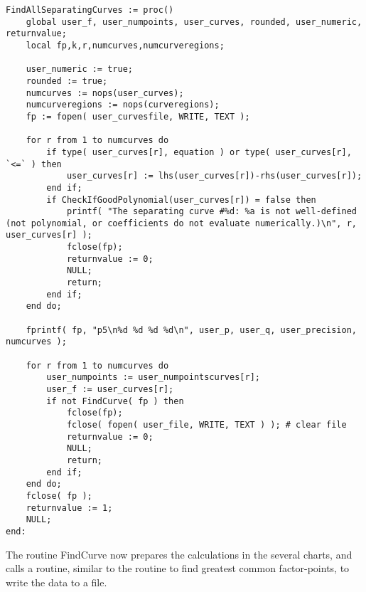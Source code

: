 \documentclass[a4paper,10pt]{article}
\begin{document}
\begin{lstlisting}[name=separatingcurves]
FindAllSeparatingCurves := proc()
    global user_f, user_numpoints, user_curves, rounded, user_numeric, returnvalue;
    local fp,k,r,numcurves,numcurveregions;

    user_numeric := true;
    rounded := true;
    numcurves := nops(user_curves);
    numcurveregions := nops(curveregions);
    fp := fopen( user_curvesfile, WRITE, TEXT );

    for r from 1 to numcurves do
        if type( user_curves[r], equation ) or type( user_curves[r], `<=` ) then
            user_curves[r] := lhs(user_curves[r])-rhs(user_curves[r]);
        end if;
        if CheckIfGoodPolynomial(user_curves[r]) = false then
            printf( "The separating curve #%d: %a is not well-defined (not polynomial, or coefficients do not evaluate numerically.)\n", r, user_curves[r] );
            fclose(fp);
            returnvalue := 0;
            NULL;
            return;
        end if;
    end do;

    fprintf( fp, "p5\n%d %d %d %d\n", user_p, user_q, user_precision, numcurves );

    for r from 1 to numcurves do
        user_numpoints := user_numpointscurves[r];
        user_f := user_curves[r];
        if not FindCurve( fp ) then
            fclose(fp);
            fclose( fopen( user_file, WRITE, TEXT ) ); # clear file
            returnvalue := 0;
            NULL;
            return;
        end if;
    end do;
    fclose( fp );
    returnvalue := 1;
    NULL;
end:
\end{lstlisting}

The routine FindCurve now prepares the calculations in the several charts,
and calls a routine, similar to the routine to find greatest common factor-points,
to write the data to a file.
\end{document}
